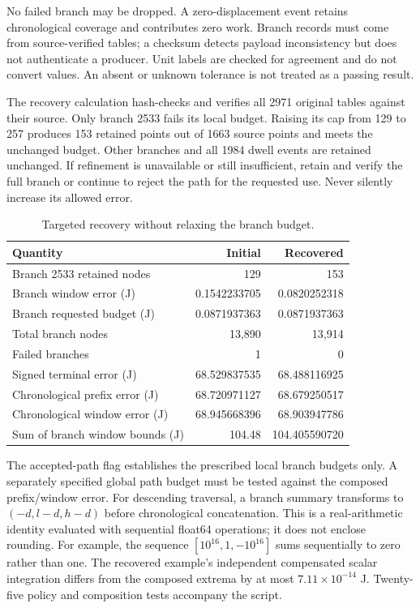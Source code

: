 \documentclass[11pt,a4paper]{article}
\begin{document}
No failed branch may be dropped. A zero-displacement event retains chronological coverage and contributes zero work. Branch records must come from source-verified tables; a checksum detects payload inconsistency but does not authenticate a producer. Unit labels are checked for agreement and do not convert values. An absent or unknown tolerance is not treated as a passing result.

The recovery calculation hash-checks and verifies all 2971 original tables against their source. Only branch 2533 fails its local budget. Raising its cap from 129 to 257 produces 153 retained points out of 1663 source points and meets the unchanged budget. Other branches and all 1984 dwell events are retained unchanged. If refinement is unavailable or still insufficient, retain and verify the full branch or continue to reject the path for the requested use. Never silently increase its allowed error.

\begin{table}[H]\centering
\caption{Targeted recovery without relaxing the branch budget.}
\begin{tabular}{lrr}\toprule
Quantity&Initial&Recovered\\\midrule
Branch 2533 retained nodes&129&153\\
Branch window error (J)&0.1542233705&0.0820252318\\
Branch requested budget (J)&0.0871937363&0.0871937363\\
Total branch nodes&13,890&13,914\\
Failed branches&1&0\\
Signed terminal error (J)&68.529837535&68.488116925\\
Chronological prefix error (J)&68.720971127&68.679250517\\
Chronological window error (J)&68.945668396&68.903947786\\
Sum of branch window bounds (J)&104.48&104.405590720\\\bottomrule
\end{tabular}\end{table}

The accepted-path flag establishes the prescribed local branch budgets only. A separately specified global path budget must be tested against the composed prefix/window error. For descending traversal, a branch summary transforms to $(-d,l-d,h-d)$ before chronological concatenation. This is a real-arithmetic identity evaluated with sequential float64 operations; it does not enclose rounding. For example, the sequence $[10^{16},1,-10^{16}]$ sums sequentially to zero rather than one. The recovered example's independent compensated scalar integration differs from the composed extrema by at most $7.11\times10^{-14}$ J. Twenty-five policy and composition tests accompany the script.
\end{document}

